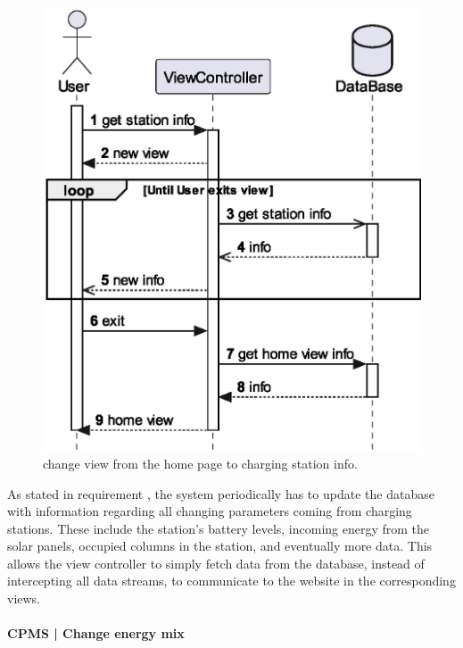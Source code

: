 \begin{figure}[h!]
    \centering
    \includegraphics[width=0.50\columnwidth]{./images/diagrams/sequences/cpms/infStation}
    \caption{change view from the home page to charging station info.}
\end{figure}

As stated in requirement , the system periodically has to update the database with information regarding all changing parameters coming from charging stations. These include the station's battery levels, incoming energy from the solar panels, occupied columns in the station, and eventually more data. This allows the view controller to simply fetch data from the database, instead of intercepting all data streams, to communicate to the website in the corresponding views.

\pagebreak

\paragraph{CPMS | Change energy mix}

